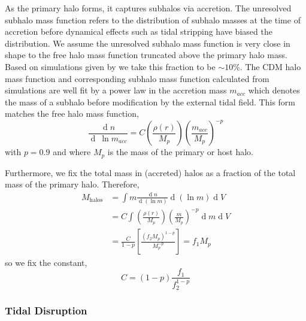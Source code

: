 \documentclass[usenatbib]{mnras}
\renewcommand{\d}[1]{\! \mathrm{d}#1 \:}
\newcommand{\deriv}[2]{\frac{\d{#1}}{\d{#2}}}
\renewcommand{\d}[1]{\ensuremath{\operatorname{d}\!{#1}}}
\begin{document}
As the primary halo forms, it captures subhalos via accretion. The unresolved subhalo mass function refers to the distribution of subhalo masses at the time of accretion before dynamical effects such as tidal stripping have biased the distribution. We assume the unresolved subhalo mass function is very close in shape to the free halo mass function truncated above the primary halo mass. Based on simulations given by \citet{dark_wave} we take this fraction to be $\sim 10\%$. The CDM halo mass function and corresponding subhalo mass function calculated from simulations \citep{pop_of_subhalos, unified_model} are well fit by a power law in the accretion mass $m_{acc}$ which denotes the mass of a subhalo before modification by the external tidal field. This form matches the free halo mass function, 
\begin{equation}
\frac{\d{n}}{\d{\: \ln{m_{acc}}}} = C \left(\frac{\rho(r)}{M_p}\right) \left(\frac{m_{acc}}{M_p} \right)^{-p} 
\end{equation}
with $p = 0.9$ and where $M_p$ is the mass of the primary or host halo.
\par
Furthermore, we fix the total mass in (accreted) halos as a fraction of the total mass of the primary halo. Therefore,
\begin{subequations}
\begin{align}
M_{\mathrm{halos}} & = \int m \deriv{n}{(\ln{m})} \d{(\ln{m})} \d{V}
\\
& = C \int \left(\frac{\rho(r)}{M_p}\right) \left(\frac{m}{M_p} \right)^{-p} \d{m} \d{V} 
\\
& = \frac{C}{1-p} \left[ \frac{(f_2 M_p)^{1-p}}{M_p^{-p}} \right] = f_1 M_p 
\end{align} 
\end{subequations}
so we fix the constant,
\begin{equation}
C = (1 - p)\frac{f_1}{f_2^{1-p}} 
\end{equation}

\subsubsection{Tidal Disruption} 
\end{document}
